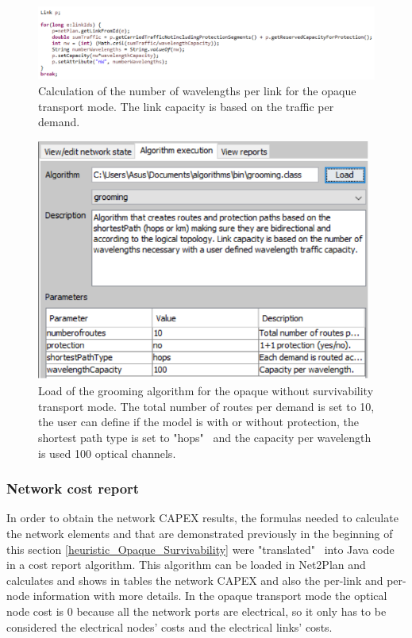 \begin{figure}[H]
\centering
\includegraphics[width=16cm]{sdf/heuristic/opaque/figures/grooming_opaque_surv2}
\caption{Calculation of the number of wavelengths per link for the opaque transport mode. The link capacity is based on the traffic per demand.}
\label{grooming_opaque_surv2}
\end{figure}

\begin{figure}[H]
\centering
\includegraphics[width=11cm]{sdf/heuristic/opaque/figures/grooming_opaque_surv3}
\caption{Load of the grooming algorithm for the opaque without survivability transport mode. The total number of routes per demand is set to 10, the user can define if the model is with or without protection, the shortest path type is set to "hops" \ and the capacity per wavelength is used 100 optical channels.}
\label{grooming_opaque_surv3}
\end{figure}

\subsubsection{Network cost report}

\vspace{11pt}
In order to obtain the network CAPEX results, the formulas needed to calculate the network elements and that are demonstrated previously in the beginning of this section \ref{heuristic_Opaque_Survivability} were "translated" \ into Java code in a cost report algorithm. This algorithm can be loaded in Net2Plan and calculates and shows in tables the network CAPEX and also the per-link and per-node information with more details.
In the opaque transport mode the optical node cost is 0 because all the network ports are electrical, so it only has to be considered the electrical nodes' costs and the electrical links' costs.

